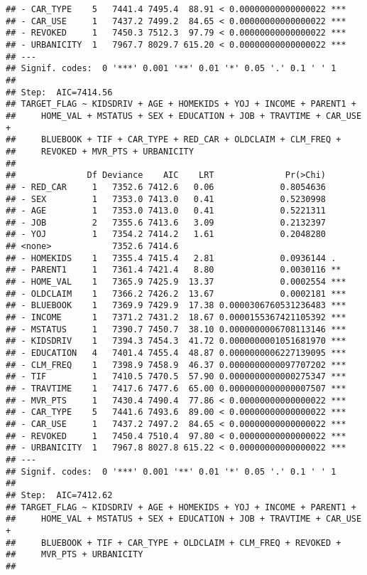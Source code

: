 \documentclass[
]{article}
\begin{document}
\begin{verbatim}
## - CAR_TYPE    5   7441.4 7495.4  88.91 < 0.00000000000000022 ***
## - CAR_USE     1   7437.2 7499.2  84.65 < 0.00000000000000022 ***
## - REVOKED     1   7450.3 7512.3  97.79 < 0.00000000000000022 ***
## - URBANICITY  1   7967.7 8029.7 615.20 < 0.00000000000000022 ***
## ---
## Signif. codes:  0 '***' 0.001 '**' 0.01 '*' 0.05 '.' 0.1 ' ' 1
## 
## Step:  AIC=7414.56
## TARGET_FLAG ~ KIDSDRIV + AGE + HOMEKIDS + YOJ + INCOME + PARENT1 + 
##     HOME_VAL + MSTATUS + SEX + EDUCATION + JOB + TRAVTIME + CAR_USE + 
##     BLUEBOOK + TIF + CAR_TYPE + RED_CAR + OLDCLAIM + CLM_FREQ + 
##     REVOKED + MVR_PTS + URBANICITY
## 
##              Df Deviance    AIC    LRT              Pr(>Chi)    
## - RED_CAR     1   7352.6 7412.6   0.06             0.8054636    
## - SEX         1   7353.0 7413.0   0.41             0.5230998    
## - AGE         1   7353.0 7413.0   0.41             0.5221311    
## - JOB         2   7355.6 7413.6   3.09             0.2132397    
## - YOJ         1   7354.2 7414.2   1.61             0.2048280    
## <none>            7352.6 7414.6                                 
## - HOMEKIDS    1   7355.4 7415.4   2.81             0.0936144 .  
## - PARENT1     1   7361.4 7421.4   8.80             0.0030116 ** 
## - HOME_VAL    1   7365.9 7425.9  13.37             0.0002554 ***
## - OLDCLAIM    1   7366.2 7426.2  13.67             0.0002181 ***
## - BLUEBOOK    1   7369.9 7429.9  17.38 0.0000306760531236483 ***
## - INCOME      1   7371.2 7431.2  18.67 0.0000155367421105392 ***
## - MSTATUS     1   7390.7 7450.7  38.10 0.0000000006708113146 ***
## - KIDSDRIV    1   7394.3 7454.3  41.72 0.0000000001051681970 ***
## - EDUCATION   4   7401.4 7455.4  48.87 0.0000000006227139095 ***
## - CLM_FREQ    1   7398.9 7458.9  46.37 0.0000000000097707202 ***
## - TIF         1   7410.5 7470.5  57.90 0.0000000000000275347 ***
## - TRAVTIME    1   7417.6 7477.6  65.00 0.0000000000000007507 ***
## - MVR_PTS     1   7430.4 7490.4  77.86 < 0.00000000000000022 ***
## - CAR_TYPE    5   7441.6 7493.6  89.00 < 0.00000000000000022 ***
## - CAR_USE     1   7437.2 7497.2  84.65 < 0.00000000000000022 ***
## - REVOKED     1   7450.4 7510.4  97.80 < 0.00000000000000022 ***
## - URBANICITY  1   7967.8 8027.8 615.22 < 0.00000000000000022 ***
## ---
## Signif. codes:  0 '***' 0.001 '**' 0.01 '*' 0.05 '.' 0.1 ' ' 1
## 
## Step:  AIC=7412.62
## TARGET_FLAG ~ KIDSDRIV + AGE + HOMEKIDS + YOJ + INCOME + PARENT1 + 
##     HOME_VAL + MSTATUS + SEX + EDUCATION + JOB + TRAVTIME + CAR_USE + 
##     BLUEBOOK + TIF + CAR_TYPE + OLDCLAIM + CLM_FREQ + REVOKED + 
##     MVR_PTS + URBANICITY
## 

\end{verbatim}
\end{document}
